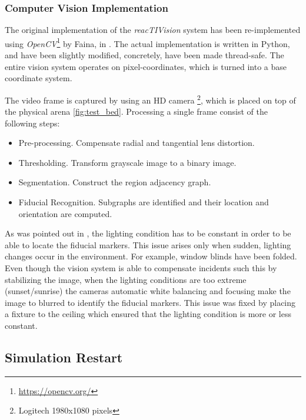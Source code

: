 \subsubsection{Computer Vision Implementation}

The original implementation of the \emph{reacTIVision} system has been re-implemented using \emph{OpenCV}\footnote{\url{https://opencv.org/}} by Faina, in \citep{faina2017automating}. The actual implementation is written in Python, and have been slightly modified, concretely, have been made thread-safe. The entire vision system operates on pixel-coordinates, which is turned into a base coordinate system.

The video frame is captured by using an HD camera \footnote{Logitech 1980x1080 pixels}, which is placed on top of the physical arena \ref{fig:test_bed}. Processing a single frame consist of the following steps: 

\begin{itemize}
  \item Pre-processing. Compensate radial and tangential lens distortion.
  \item Thresholding. Transform grayscale image to a binary image.
  \item Segmentation. Construct the region adjacency graph.
  \item Fiducial Recognition. Subgraphs are identified and their location and orientation are computed.   
\end{itemize}

As was pointed out in \citep{faina2017automating}, the lighting condition has to be constant in order to be able to locate the fiducial markers. This issue arises only when sudden, lighting changes occur in the environment. For example, window blinds have been folded. Even though the vision system is able to compensate incidents such this by stabilizing the image, when the lighting conditions are too extreme (sunset/sunrise) the cameras automatic white balancing and focusing make the image to blurred to identify the fiducial markers. This issue was fixed by placing a fixture to the ceiling which ensured that the lighting condition is more or less constant.


\subsection{Simulation Restart}

